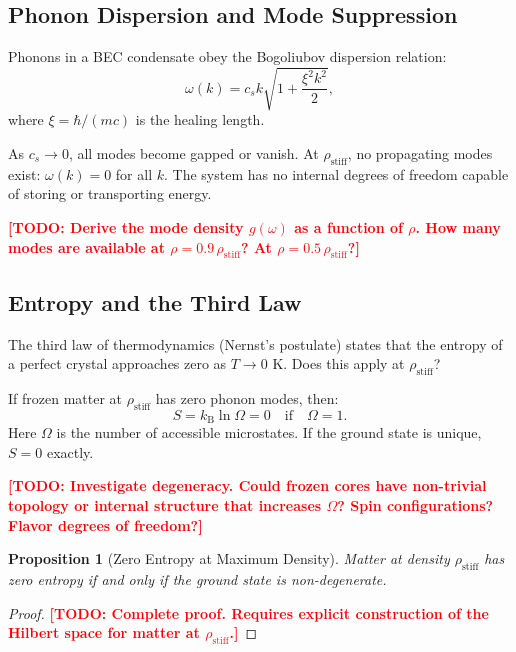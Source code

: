 \documentclass[11pt,a4paper]{article}
\newcommand{\kB}{\ensuremath{k_{\mathrm{B}}}}
\newcommand{\rhostiff}{\ensuremath{\rho_{\mathrm{stiff}}}}
\newcommand{\cs}{\ensuremath{c_s}}
\newcommand{\TODO}[1]{\textcolor{red}{\textbf{[TODO: #1]}}}
\newtheorem{proposition}[theorem]{Proposition}
\theoremstyle{definition}
\theoremstyle{remark}
\begin{document}
\subsection{Phonon Dispersion and Mode Suppression}
\label{sec:phonon_dispersion}

Phonons in a BEC condensate obey the Bogoliubov dispersion relation:
\begin{equation}
\omega(k) = c_s k \sqrt{1 + \frac{\xi^2 k^2}{2}},
\label{eq:bogoliubov}
\end{equation}
where $\xi = \hbar/(mc)$ is the healing length.

As $\cs \to 0$, all modes become gapped or vanish. At $\rhostiff$, no propagating modes exist: $\omega(k) = 0$ for all $k$. The system has no internal degrees of freedom capable of storing or transporting energy.

\TODO{Derive the mode density $g(\omega)$ as a function of $\rho$. How many modes are available at $\rho = 0.9\, \rhostiff$? At $\rho = 0.5\, \rhostiff$?}

\subsection{Entropy and the Third Law}
\label{sec:entropy}

The third law of thermodynamics (Nernst's postulate) states that the entropy of a perfect crystal approaches zero as $T \to 0$ K. Does this apply at $\rhostiff$?

\vspace{0.5em}
\noindent
If frozen matter at $\rhostiff$ has zero phonon modes, then:
\begin{equation}
S = \kB \ln \Omega = 0 \quad \text{if} \quad \Omega = 1.
\end{equation}
Here $\Omega$ is the number of accessible microstates. If the ground state is unique, $S = 0$ exactly.

\TODO{Investigate degeneracy. Could frozen cores have non-trivial topology or internal structure that increases $\Omega$? Spin configurations? Flavor degrees of freedom?}

\begin{proposition}[Zero Entropy at Maximum Density]
Matter at density $\rhostiff$ has zero entropy if and only if the ground state is non-degenerate.
\end{proposition}

\begin{proof}
\TODO{Complete proof. Requires explicit construction of the Hilbert space for matter at $\rhostiff$.}
\end{proof}
\end{document}
